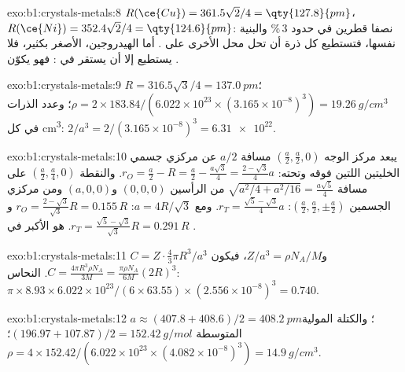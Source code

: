 \begin{solution}{exo:b1:crystals-metals:8}
$R(\ce{Cu}) = 361.5\sqrt2/4 = \qty{127.8}{pm}$، $R(\ce{Ni}) = 352.4\sqrt2/4
= \qty{124.6}{pm}$: نصفا قطرين في حدود 3\,\% والبنية نفسها، فتستطيع كل
ذرة أن تحل محل الأخرى على . أما الهيدروجين، الأصغر بكثير، فلا
يستطيع إلا أن يستقر في : فهو يكوّن .
\end{solution}

\begin{solution}{exo:b1:crystals-metals:9}
$R = 316.5\sqrt3/4 = \qty{137.0}{pm}$؛ $\rho = 2 \times 183.84/(6.022 \times
10^{23} \times (3.165 \times 10^{-8})^3) = \qty{19.26}{g/cm^3}$؛ وعدد الذرات في كل
\unit{cm^3}: $2/a^3 = 2/(3.165 \times 10^{-8})^3 = \num{6.31e22}$.
\end{solution}

\begin{solution}{exo:b1:crystals-metals:10}
يبعد مركز الوجه $(\frac a2,\frac a2,0)$ مسافة $a/2$ عن مركزي جسمي
الخليتين اللتين فوقه وتحته: $r_O = \frac a2 - R = \frac a2 - \frac{a\sqrt3}{4}
= \frac{2-\sqrt3}{4}a$. والنقطة $(\frac a2,\frac a4,0)$ على مسافة
$\sqrt{a^2/4 + a^2/16} = \frac{a\sqrt5}{4}$ من الرأسين $(0,0,0)$
و$(a,0,0)$ ومن مركزي الجسمين $(\frac a2,\frac a2,\pm\frac a2)$:
$r_T = \frac{\sqrt5 - \sqrt3}{4}a$. ومع $a = 4R/\sqrt3$:
$r_O = \frac{2-\sqrt3}{\sqrt3}R = 0.155\,R$
و$r_T = \frac{\sqrt5-\sqrt3}{\sqrt3}R = 0.291\,R$.  هو
الأكبر في .
\end{solution}

\begin{solution}{exo:b1:crystals-metals:11}
$C = Z\cdot\frac43\pi R^3/a^3$ و$Z/a^3 = \rho N_A/M$، فيكون $C =
\frac{4\pi R^3\rho N_A}{3M} = \frac{\pi\rho N_A}{6M}(2R)^3$. النحاس:
$\pi \times 8.93 \times 6.022 \times 10^{23}/(6 \times 63.55) \times (2.556
\times 10^{-8})^3 = 0.740$.
\end{solution}

\begin{solution}{exo:b1:crystals-metals:12}
$a \approx (407.8 + 408.6)/2 = \qty{408.2}{pm}$؛ والكتلة المولية المتوسطة $(196.97 +
107.87)/2 = \qty{152.42}{g/mol}$؛ $\rho = 4 \times 152.42/(6.022 \times
10^{23} \times (4.082 \times 10^{-8})^3) = \qty{14.9}{g/cm^3}$.
\end{solution}

